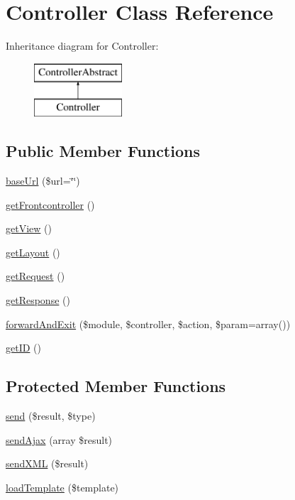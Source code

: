 \hypertarget{class_anemo_1_1_controller}{
\section{Controller Class Reference}
\label{class_anemo_1_1_controller}
}
Inheritance diagram for Controller:\begin{figure}[H]
\begin{center}
\leavevmode
\includegraphics[height=2.000000cm]{class_anemo_1_1_controller}
\end{center}
\end{figure}
\subsection*{Public Member Functions}
\begin{DoxyCompactItemize}
\item 
\hyperlink{class_anemo_1_1_controller_ad011c3639122bebffc3065dfda195ba8}{baseUrl} (\$url=\char`\"{}\char`\"{})
\item 
\hyperlink{class_anemo_1_1_controller_aa182525e446da02ad9af5d903f3f8f66}{getFrontcontroller} ()
\item 
\hyperlink{class_anemo_1_1_controller_a50677812ea3f0258f7d03bbac5265413}{getView} ()
\item 
\hyperlink{class_anemo_1_1_controller_a5c316721766e9cd8ad5d0085e64048ed}{getLayout} ()
\item 
\hyperlink{class_anemo_1_1_controller_adf1a35ad20e475c59cc0967d5764aa22}{getRequest} ()
\item 
\hyperlink{class_anemo_1_1_controller_a6c907e8af775e517a77037dd0164222f}{getResponse} ()
\item 
\hyperlink{class_anemo_1_1_controller_ab2feca11fcd7ef394cad18a2ddca63f5}{forwardAndExit} (\$module, \$controller, \$action, \$param=array())
\item 
\hyperlink{class_anemo_1_1_controller_a30dd7fff4fec7a39f9be9d27d4b22a59}{getID} ()
\end{DoxyCompactItemize}
\subsection*{Protected Member Functions}
\begin{DoxyCompactItemize}
\item 
\hyperlink{class_anemo_1_1_controller_a81d3d1fbaf410923367685f468766513}{send} (\$result, \$type)
\item 
\hyperlink{class_anemo_1_1_controller_a54e05c569278621dedec32bd15e1e381}{sendAjax} (array \$result)
\item 
\hyperlink{class_anemo_1_1_controller_a506eee4f1f61534baae414a0a5319665}{sendXML} (\$result)
\item 
\hyperlink{class_anemo_1_1_controller_a4cc6aa9c5d8239988a1be55b2f855421}{loadTemplate} (\$template)
\end{DoxyCompactItemize}


